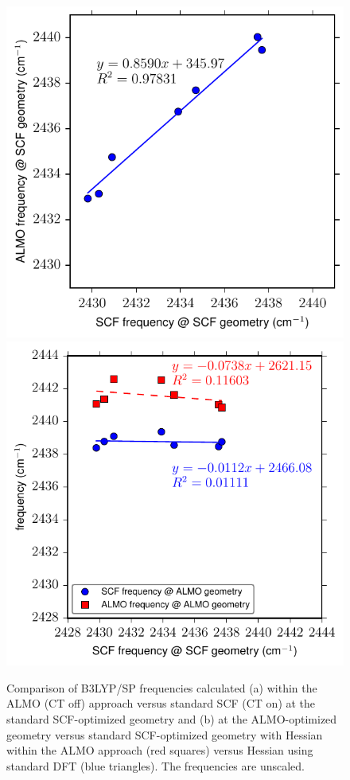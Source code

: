 \begin{figure}
  \centering
  \includegraphics{paper_02/Fig2a.pdf}
  \includegraphics{paper_02/Fig2b.pdf}
  \caption{Comparison of B3LYP/SP frequencies calculated (a) within the ALMO (CT off) approach versus standard SCF (CT on) at the standard SCF-optimized geometry and (b) at the ALMO-optimized geometry versus standard SCF-optimized geometry with Hessian within the ALMO approach (red squares) versus Hessian using standard DFT (blue triangles). The frequencies are unscaled.}
  \label{paper_02:fig:2}
\end{figure}

